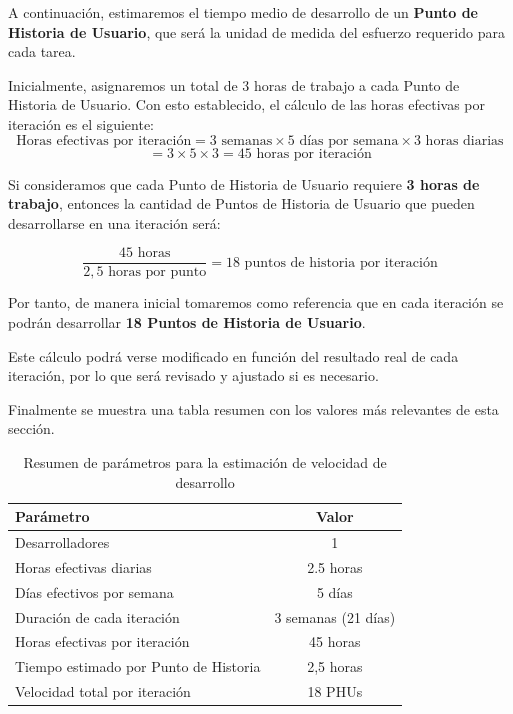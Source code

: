 A continuación, estimaremos el tiempo medio de desarrollo de un \textbf{Punto de Historia de Usuario}, que será la unidad de medida del esfuerzo requerido para cada tarea. 

Inicialmente, asignaremos un total de 3 horas de trabajo a cada Punto de Historia de Usuario. Con esto establecido, el cálculo de las horas efectivas por iteración es el siguiente:
\begin{equation*}
    \text{Horas efectivas por iteración} = 3 \text{ semanas} \times 5 \text{ días por semana} \times 3 \text{ horas diarias}
\end{equation*}
\begin{equation*}
    = 3 \times 5 \times 3 = 45 \text{ horas por iteración}
\end{equation*}

Si consideramos que cada Punto de Historia de Usuario requiere \textbf{3 horas de trabajo}, entonces la cantidad de Puntos de Historia de Usuario que pueden desarrollarse en una iteración será:

\begin{equation*}
    \frac{45 \text{ horas}}{2,5 \text{ horas por punto}} = 18 \text{ puntos de historia por iteración}    
\end{equation*}


Por tanto, de manera inicial tomaremos como referencia que en cada iteración se podrán desarrollar \textbf{18 Puntos de Historia de Usuario}.

Este cálculo podrá verse modificado en función del resultado real de cada iteración, por lo que será revisado y ajustado si es necesario.


Finalmente se muestra una tabla resumen con los valores más relevantes de esta sección.
\begin{table}[H]
    \centering
    \renewcommand{\arraystretch}{1.3}
    \begin{tabular}{|l|c|}
        \hline
        \rowcolor[HTML]{D3D3D3} 
        \textbf{Parámetro} & \textbf{Valor} \\ \hline
        Desarrolladores & 1 \\ \hline
        Horas efectivas diarias & 2.5 horas \\ \hline
        Días efectivos por semana & 5 días \\ \hline
        Duración de cada iteración & 3 semanas (21 días) \\ \hline
        Horas efectivas por iteración & 45 horas \\ \hline
        Tiempo estimado por Punto de Historia & 2,5 horas \\ \hline
        Velocidad total por iteración & 18 PHUs \\ \hline
    \end{tabular}
    \caption{Resumen de parámetros para la estimación de velocidad de desarrollo}
    \label{tab:estimacion_velocidad}
\end{table}



